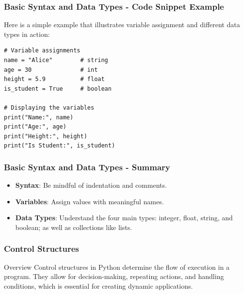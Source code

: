 \documentclass{beamer}
\begin{document}
\begin{frame}[fragile]
    \frametitle{Basic Syntax and Data Types - Code Snippet Example}
    Here is a simple example that illustrates variable assignment and different data types in action:
    \begin{lstlisting}
# Variable assignments
name = "Alice"        # string
age = 30              # int
height = 5.9          # float
is_student = True     # boolean

# Displaying the variables
print("Name:", name)
print("Age:", age)
print("Height:", height)
print("Is Student:", is_student)
    \end{lstlisting}
\end{frame}

\begin{frame}[fragile]
    \frametitle{Basic Syntax and Data Types - Summary}
    \begin{itemize}
        \item \textbf{Syntax}: Be mindful of indentation and comments.
        \item \textbf{Variables}: Assign values with meaningful names.
        \item \textbf{Data Types}: Understand the four main types: integer, float, string, and boolean; as well as collections like lists.
    \end{itemize}
\end{frame}

\begin{frame}
    \frametitle{Control Structures}
    \begin{block}{Overview}
        Control structures in Python determine the flow of execution in a program. They allow for decision-making, repeating actions, and handling conditions, which is essential for creating dynamic applications.
    \end{block}
\end{frame}
\end{document}
